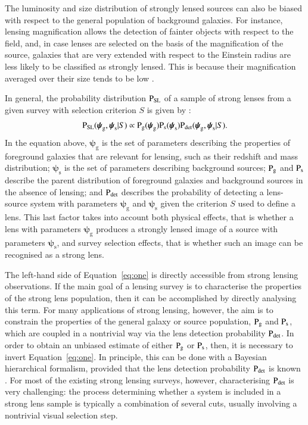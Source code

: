 \documentclass{aa}
\def\psilens{\boldsymbol{\psi}_\mathrm{g}}
\def\psisource{\boldsymbol{\psi}_\mathrm{s}}
\def\prlens{{\rm P}_\mathrm{g}}
\def\prsource{{\rm P}_\mathrm{s}}
\def\prsl{{\rm P}_\mathrm{{SL}}}
\def\pdet{{\rm P}_\mathrm{det}}
\def\Eref#1{Equation~\ref{#1}\xspace}
\begin{document}
The luminosity and size distribution of strongly lensed sources can also be biased with respect to the general population of background galaxies.
For instance, lensing magnification allows the detection of fainter objects with respect to the field, and, in case lenses are selected on the basis of the magnification of the source, galaxies that are very extended with respect to the Einstein radius are less likely to be classified as strongly lensed. This is because their magnification averaged over their size tends to be low \citep[see the discussion in section 5.3 of][]{O+A17}.

In general, the probability distribution $\prsl$ of a sample of strong lenses from a given survey with selection criterion $S$ is given by \citep{Son22}:
\begin{equation}\label{eq:one}
\prsl(\psilens,\psisource|S) \propto \prlens(\psilens)\prsource(\psisource)\pdet(\psilens,\psisource|S).
\end{equation}
In the equation above, $\psilens$ is the set of parameters describing the properties of foreground galaxies that are relevant for lensing, such as their redshift and mass distribution; $\psisource$ is the set of parameters describing background sources; $\prlens$ and $\prsource$ describe the parent distribution of foreground galaxies and background sources in the absence of lensing; and $\pdet$ describes the probability of detecting a lens-source system with parameters $\psilens$ and $\psisource$ given the criterion $S$ used to define a lens.
This last factor takes into account both physical effects, that is whether a lens with parameters $\psilens$ produces a strongly lensed image of a source with parameters $\psisource$, and survey selection effects, that is whether such an image can be recognised as a strong lens.

The left-hand side of \Eref{eq:one} is directly accessible from strong lensing observations. If the main goal of a lensing survey is to characterise the properties of the strong lens population, then it can be accomplished by directly analysing this term. For many applications of strong lensing, however, the aim is to constrain the properties of the general galaxy or source population, $\prlens$ and $\prsource$, which are coupled in a nontrivial way via the lens detection probability $\pdet$.
In order to obtain an unbiased estimate of either $\prlens$ or $\prsource$, then, it is necessary to invert \Eref{eq:one}.
In principle, this can be done with a Bayesian hierarchical formalism, provided that the lens detection probability $\pdet$ is known \citep{Son22}.
For most of the existing strong lensing surveys, however, characterising $\pdet$ is very challenging: the process determining whether a system is included in a strong lens sample is typically a combination of several cuts, usually involving a nontrivial visual selection step. 
\end{document}
